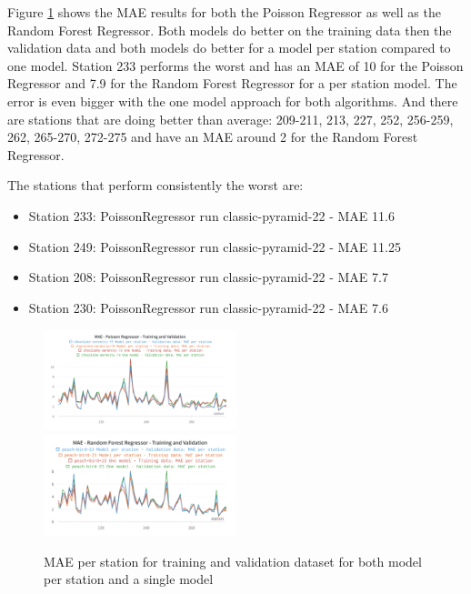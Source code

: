 \documentclass[a4paper]{article}
\begin{document}
    Figure \ref{fig:simple-pr-rfr-mae-perstation} shows the MAE results for both the Poisson Regressor as well as the
    Random Forest Regressor. Both models do better on the training data then the validation data and both models do
    better for a model per station compared to one model. Station 233 performs the worst and has an MAE of 10 for the
    Poisson Regressor and 7.9 for the Random Forest Regressor for a per station model. The error is even bigger with the
    one model approach for both algorithms. And there are stations that are doing better than average: 209-211, 213, 227,
    252, 256-259, 262, 265-270, 272-275 and have an MAE around 2 for the Random Forest Regressor.

    The stations that perform consistently the worst are:
    \begin{itemize}
        \item Station 233: PoissonRegressor run classic-pyramid-22 - MAE 11.6
        \item Station 249: PoissonRegressor run classic-pyramid-22 - MAE 11.25
        \item Station 208: PoissonRegressor run classic-pyramid-22 - MAE 7.7
        \item Station 230: PoissonRegressor run classic-pyramid-22 - MAE 7.6
    \end{itemize}

    \begin{figure}[h]
        \includegraphics[width=0.5\textwidth]{mae-pr-perstation}\hfill
        \includegraphics[width=0.5\textwidth]{mae-rfr-comparison}
        \caption{MAE per station for training and validation dataset for both model per station and a single model}
        \label{fig:simple-pr-rfr-mae-perstation}
    \end{figure}
\end{document}
